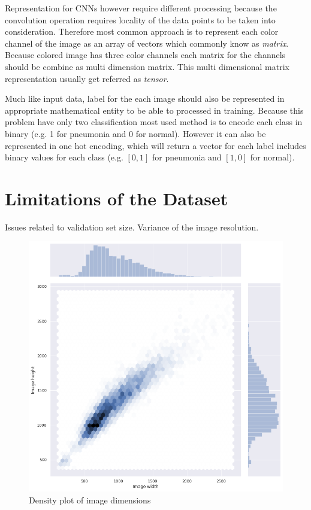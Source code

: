 Representation for CNNs however require different processing because the convolution operation requires locality of the data points to be taken into consideration.
Therefore most common approach is to represent each color channel of the image as an array of vectors which commonly know as \emph{matrix}.
Because colored image has three color channels each matrix for the channels should be combine as multi dimension matrix.
This multi dimensional matrix representation usually get referred as \emph{tensor}.

Much like input data, label for the each image should also be represented in appropriate mathematical entity to be able to processed in training.
Because this problem have only two classification most used method is to encode each class in binary (e.g. 1 for pneumonia and 0 for normal).
However it can also be represented in one hot encoding, which will return a vector for each label includes binary values for each class (e.g. $[0, 1]$ for pneumonia and $[1, 0]$ for normal).


\section{Limitations of the Dataset}
Issues related to validation set size. Variance of the image resolution.

\begin{figure}[H]
    \centering
    \includegraphics[width=\textwidth]{img/image_dims_density.png}
    \caption{Density plot of image dimensions}
    \label{fig:imagedimensions}
  \end{figure}

